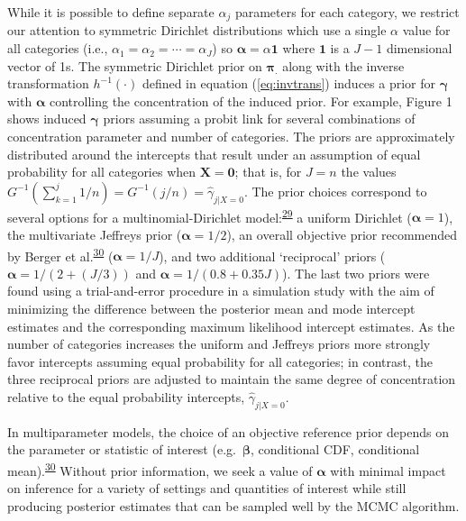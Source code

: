 \documentclass[
]{article}
\begin{document}
While it is possible to define separate \(\alpha_j\) parameters for each category, we restrict our attention to symmetric Dirichlet distributions which use a single \(\alpha\) value for all categories (i.e., \(\alpha_1 = \alpha_2 = \cdots = \alpha_J\)) so \(\boldsymbol{\alpha}=\alpha\boldsymbol{1}\) where \(\boldsymbol{1}\) is a \(J-1\) dimensional vector of 1s. The symmetric Dirichlet prior on \(\boldsymbol{\pi_{.}}\) along with the inverse transformation \(h^{-1}(\cdot)\) defined in equation (\ref{eq:invtrans}) induces a prior for \(\boldsymbol{\gamma}\) with \(\boldsymbol{\alpha}\) controlling the concentration of the induced prior. For example, Figure 1 shows induced \(\boldsymbol{\gamma}\) priors assuming a probit link for several combinations of concentration parameter and number of categories. The priors are approximately distributed around the intercepts that result under an assumption of equal probability for all categories when \(\boldsymbol{X}=\boldsymbol{0}\); that is, for \(J=n\) the values \(G^{-1}(\sum_{k=1}^j 1/n)=G^{-1}(j/n)=\hat{\gamma}_{j|X=0}\). The prior choices correspond to several options for a multinomial-Dirichlet model:\textsuperscript{\protect\hyperlink{ref-gelman_bayesian_2014}{29}} a uniform Dirichlet (\(\boldsymbol{\alpha}=1\)), the multivariate Jeffreys prior (\(\boldsymbol{\alpha}=1/2\)), an overall objective prior recommended by Berger et al.\textsuperscript{\protect\hyperlink{ref-berger_overall_2015}{30}} (\(\boldsymbol{\alpha}=1/J\)), and two additional `reciprocal' priors (\(\boldsymbol{\alpha}=1/(2+(J/3))\) and \(\boldsymbol{\alpha}=1/(0.8+0.35J)\)). The last two priors were found using a trial-and-error procedure in a simulation study with the aim of minimizing the difference between the posterior mean and mode intercept estimates and the corresponding maximum likelihood intercept estimates. As the number of categories increases the uniform and Jeffreys priors more strongly favor intercepts assuming equal probability for all categories; in contrast, the three reciprocal priors are adjusted to maintain the same degree of concentration relative to the equal probability intercepts, \(\hat{\gamma}_{j|X=0}\).

In multiparameter models, the choice of an objective reference prior depends on the parameter or statistic of interest (e.g.~\(\boldsymbol{\beta}\), conditional CDF, conditional mean).\textsuperscript{\protect\hyperlink{ref-berger_overall_2015}{30}} Without prior information, we seek a value of \(\boldsymbol{\alpha}\) with minimal impact on inference for a variety of settings and quantities of interest while still producing posterior estimates that can be sampled well by the MCMC algorithm.
\end{document}
